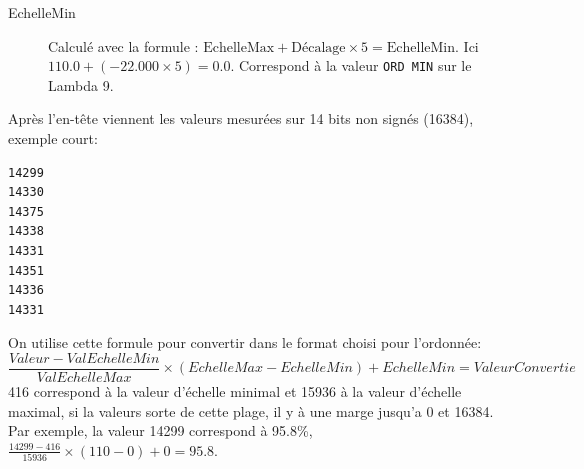\documentclass[a4paper, 12pt]{article}
\begin{document}
\begin{description}
	\item[EchelleMin] Calculé avec la formule : $ \text{EchelleMax} + \text{Décalage} \times 5 = \text{EchelleMin}$. Ici $110.0 + ( -22.000 \times 5 ) = 0.0$. Correspond à la valeur \verb|ORD MIN| sur le Lambda 9.

\end{description}

Après l'en-tête viennent les valeurs mesurées sur 14 bits non signés (16384), exemple court:
\begin{lstlisting}
14299
14330
14375
14338
14331
14351
14336
14331
\end{lstlisting}
On utilise cette formule pour convertir dans le format choisi pour l'ordonnée:
\[ \frac{Valeur - ValEchelleMin}{ValEchelleMax} \times (EchelleMax - EchelleMin) + EchelleMin = ValeurConvertie \]
416 correspond à la valeur d'échelle minimal et 15936 à la valeur d'échelle maximal, si la valeurs sorte de cette plage, il y à une marge jusqu'a 0 et 16384.
Par exemple, la valeur 14299 correspond à 95.8\%, $\frac{14299-416}{15936} \times (110-0)+0 = 95.8$.
\end{document}
